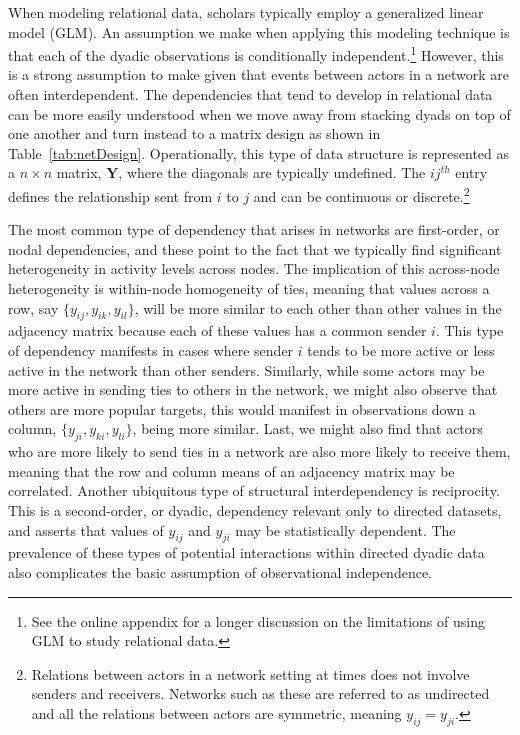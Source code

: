 \documentclass[9pt,twocolumn,twoside,lineno]{pnas-new}
\begin{document}
When modeling relational data, scholars typically employ a generalized linear model (GLM). An assumption we make when applying this modeling technique is that each of the dyadic observations is conditionally independent.\footnote{See the online appendix for a longer discussion on the limitations of using GLM to study relational data.} However, this is a strong assumption to make given that events between actors in a network are often interdependent. The dependencies that tend to develop in relational data can be more easily understood when we move away from stacking dyads on top of one another and turn instead to a matrix design as shown in Table~\ref{tab:netDesign}. Operationally, this type of data structure is represented as a $n \times n$ matrix, $\mathbf{Y}$, where the diagonals are typically undefined. The $ij^{th}$ entry defines the relationship sent from $i$ to $j$ and can be continuous or discrete.\footnote{Relations between actors in a network setting at times does not involve senders and receivers. Networks such as these are referred to as undirected and all the relations between actors are symmetric, meaning $y_{ij}=y_{ji}$.}

The most common type of dependency that arises in networks are first-order, or nodal dependencies, and these point to the fact that we typically find significant heterogeneity in activity levels across nodes. The implication of this across-node heterogeneity is within-node homogeneity of ties, meaning that values across a row, say $\{y_{ij},y_{ik},y_{il}\}$, will be more similar to each other than other values in the adjacency matrix because each of these values has a common sender $i$. This type of dependency manifests in cases where sender $i$ tends to be more active or less active in the network than other senders. Similarly, while some actors may be more active in sending ties to others in the network, we might also observe that others are more popular targets, this would manifest in observations down a column, $\{y_{ji},y_{ki},y_{li}\}$, being more similar. Last, we might also find that actors who are more likely to send ties in a network are also more likely to receive them, meaning that the row and column means of an adjacency matrix may be correlated. Another ubiquitous type of structural interdependency is reciprocity. This is a second-order, or dyadic, dependency relevant only to directed datasets, and asserts that values of $y_{ij}$ and $y_{ji}$ may be statistically dependent. The prevalence of these types of potential interactions within directed dyadic data also complicates the basic assumption of observational independence.
\end{document}
